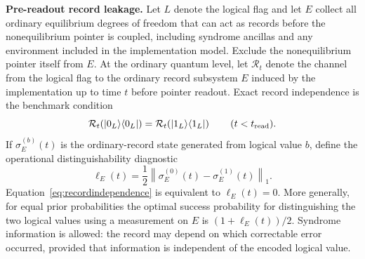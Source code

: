 \documentclass[pdflatex,sn-mathphys-num]{sn-jnl}
\theoremstyle{thmstyleone}
\begin{document}
\medskip
\noindent\textbf{Pre-readout record leakage.}
Let $L$ denote the logical flag and let $E$ collect all ordinary equilibrium degrees of freedom that can act as records before the nonequilibrium pointer is coupled, including syndrome ancillas and any environment included in the implementation model. Exclude the nonequilibrium pointer itself from $E$. At the ordinary quantum level, let $\mathcal R_t$ denote the channel from the logical flag to the ordinary record subsystem $E$ induced by the implementation up to time $t$ before pointer readout. Exact record independence is the benchmark condition
\begin{equation}
\mathcal R_t\!\left(|0_L\rangle\langle0_L|\right)
=
\mathcal R_t\!\left(|1_L\rangle\langle1_L|\right)
\qquad (t<t_{\rm read}).
\label{eq:recordindependence}
\end{equation}
If $\sigma_E^{(b)}(t)$ is the ordinary-record state generated from logical value $b$, define the operational distinguishability diagnostic
\begin{equation}
\ell_E(t)=\frac12\left\|\sigma_E^{(0)}(t)-\sigma_E^{(1)}(t)\right\|_1.
\label{eq:recordleakage}
\end{equation}
Equation~\eqref{eq:recordindependence} is equivalent to $\ell_E(t)=0$. More generally, for equal prior probabilities the optimal success probability for distinguishing the two logical values using a measurement on $E$ is $(1+\ell_E(t))/2$. Syndrome information is allowed: the record may depend on which correctable error occurred, provided that information is independent of the encoded logical value.
\end{document}
